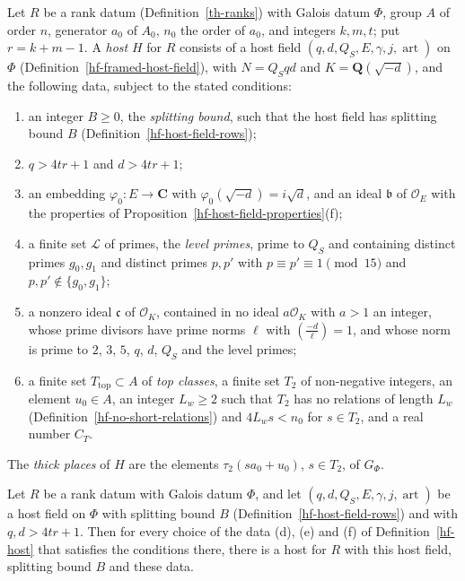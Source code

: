 \begin{definition}\label{hf-host}
Let $R$ be a rank datum (Definition~\ref{th-ranks}) with Galois datum $\Phi$, group $A$ of order $n$, generator
$a_0$ of $A_0$, $n_0$ the order of $a_0$, and integers $k,m,t$; put $r=k+m-1$. A \emph{host} $H$
for $R$ consists of a host field $(q,d,Q_S,E,\gamma,j,\operatorname{art})$ on $\Phi$
(Definition~\ref{hf-framed-host-field}), with $N=Q_Sqd$ and $K=\mathbf Q(\sqrt{-d})$, and the
following data, subject to the stated conditions:
\begin{enumerate}
\item an integer $B\geq0$, the \emph{splitting bound}, such that the host field has splitting bound
  $B$ (Definition~\ref{hf-host-field-rows});
\item $q>4tr+1$ and $d>4tr+1$;
\item an embedding $\varphi_0\colon E\to\mathbf C$ with $\varphi_0(\sqrt{-d})=i\sqrt d$, and an
  ideal $\mathfrak b$ of $\mathcal O_E$ with the properties of
  Proposition~\ref{hf-host-field-properties}(f);
\item a finite set $\mathcal L$ of primes, the \emph{level primes}, prime to $Q_S$ and containing
  distinct primes $g_0,g_1$ and distinct primes $p,p'$ with $p\equiv p'\equiv1\pmod{15}$ and
  $p,p'\notin\{g_0,g_1\}$;
\item a nonzero ideal $\mathfrak c$ of $\mathcal O_K$, contained in no ideal $a\mathcal O_K$ with
  $a>1$ an integer, whose prime divisors have prime norms $\ell$ with $\left(\frac{-d}{\ell}\right)=1$,
  and whose norm is prime to $2$, $3$, $5$, $q$, $d$, $Q_S$ and the level primes;
\item a finite set $T_{\mathrm{top}}\subset A$ of \emph{top classes}, a finite set $T_2$ of
  non-negative integers, an element $u_0\in A$, an integer $L_w\geq2$ such that $T_2$ has no
  relations of length $L_w$ (Definition~\ref{hf-no-short-relations}) and $4L_ws<n_0$ for $s\in T_2$,
  and a real number $C_T$.
\end{enumerate}
The \emph{thick places} of $H$ are the elements $\tau_2(sa_0+u_0)$, $s\in T_2$, of $G_\Phi$.
\end{definition}

\begin{lemma}\label{hf-host-extension}
Let $R$ be a rank datum with Galois datum $\Phi$, and let $(q,d,Q_S,E,\gamma,j,\operatorname{art})$ be a host field
on $\Phi$ with splitting bound $B$ (Definition~\ref{hf-host-field-rows}) and with $q,d>4tr+1$. Then
for every choice of the data (d), (e) and (f) of Definition~\ref{hf-host} that satisfies the
conditions there, there is a host for $R$ with this host field, splitting bound $B$ and these data.
\end{lemma}

